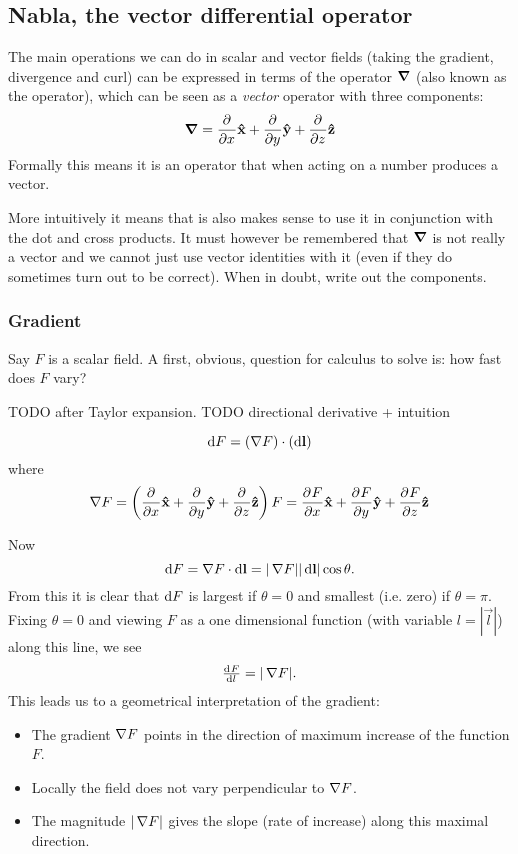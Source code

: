 \subsection{Nabla, the vector differential operator}
The main operations we can do in scalar and vector fields (taking the gradient, divergence and curl) can be expressed in terms of the  operator $\operatorname{\boldsymbol{\mathrm{\nabla}}}$ (also known as the  operator), which can be seen as a \textit{vector} operator with three components:
\[ \operatorname{\boldsymbol{\mathrm{\nabla}}} =  \frac{\partial{^{}}}{\partial{{x}^{}}} \boldsymbol{\mathrm{\hat{x}}} +  \frac{\partial{^{}}}{\partial{{y}^{}}} \boldsymbol{\mathrm{\hat{y}}} +  \frac{\partial{^{}}}{\partial{{z}^{}}} \boldsymbol{\mathrm{\hat{z}}} \]
Formally this means it is an operator that when acting on a number produces a vector. 

More intuitively it means that is also makes sense to use it in conjunction with the dot and cross products. It must however be remembered that $\operatorname{\boldsymbol{\mathrm{\nabla}}}$ is not really a vector and we cannot just use vector identities with it (even if they do sometimes turn out to be correct). When in doubt, write out the components.

\subsubsection{Gradient}
Say $F$ is a scalar field. A first, obvious, question for calculus to solve is: how fast does $F$ vary?

TODO after Taylor expansion. TODO directional derivative + intuition

\[ \operatorname{d \!}{F} = (\mathop{}\! \nabla F)\cdot (\operatorname{d \!}{\boldsymbol{\mathrm{l}}}) \]
where
\[ \mathop{}\! \nabla F = \left( \frac{\partial{^{}}}{\partial{{x}^{}}} \boldsymbol{\mathrm{\hat{x}}} +  \frac{\partial{^{}}}{\partial{{y}^{}}} \boldsymbol{\mathrm{\hat{y}}} +  \frac{\partial{^{}}}{\partial{{z}^{}}} \boldsymbol{\mathrm{\hat{z}}}\right)F =  \frac{\partial{^{}}F}{\partial{{x}^{}}} \boldsymbol{\mathrm{\hat{x}}} +  \frac{\partial{^{}}F}{\partial{{y}^{}}} \boldsymbol{\mathrm{\hat{y}}} +  \frac{\partial{^{}}F}{\partial{{z}^{}}} \boldsymbol{\mathrm{\hat{z}}} \]

Now
\[ \operatorname{d \!}{F} = \mathop{}\! \nabla F \cdot \operatorname{d \!}{\boldsymbol{\mathrm{l}}} = |\mathop{}\! \nabla F||\operatorname{d \!}{\boldsymbol{\mathrm{l}}}|\cos\theta. \]
From this it is clear that $\operatorname{d \!}{F}$ is largest if $\theta = 0$ and smallest (i.e. zero) if $\theta = \pi$. Fixing $\theta = 0$ and viewing $F$ as a one dimensional function (with variable $l = |\vec{l}|$) along this line, we see
\[ \od{F}{l} = |\grad F|. \]
This leads us to a geometrical interpretation of the gradient:
\begin{itemize}
\item The gradient $\mathop{}\! \nabla F$ points in the direction of maximum increase of the function $F$.
\item Locally the field does not vary perpendicular to $\mathop{}\! \nabla F$.
\item The magnitude $|\mathop{}\! \nabla F|$ gives the slope (rate of increase) along this maximal direction.
\end{itemize}

